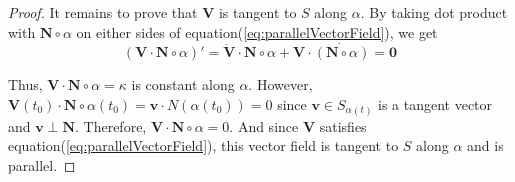 \begin{proof}
	It remains to prove that $\mathbf{V}$ is tangent to $S$ along $\alpha$. By taking dot product with $\mathbf{N} \circ \alpha$ on either sides of equation(\ref{eq:parallelVectorField}), we get
\begin{equation}
	(\mathbf{V} \cdot \mathbf{N} \circ \alpha)'= \dot{\mathbf{V}} \cdot \mathbf{N} \circ \alpha + \mathbf{V} \cdot \dot{(\mathbf{N} \circ \alpha)} = \mathbf{0}
\end{equation}

	Thus, $\mathbf{V} \cdot \mathbf{N} \circ \alpha = \kappa$ is constant along $\alpha$. However, $\mathbf{V}(t_0) \cdot \mathbf{N} \circ \alpha(t_0) = \mathbf{v} \cdot N(\alpha(t_0)) = 0$ since $\mathbf{v} \in S_{\alpha(t)}$ is a tangent vector and $\mathbf{v} \perp \mathbf{N}$. Therefore, $\mathbf{V} \cdot \mathbf{N} \circ \alpha = 0$. And since $\mathbf{V}$ satisfies equation(\ref{eq:parallelVectorField}), this vector field is tangent to $S$ along $\alpha$ and is parallel.
\end{proof}


